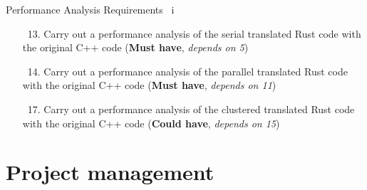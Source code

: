 \documentclass[10pt,aspectratio=169]{beamer}
\newcommand{\cmark}{\ding{51}}
\newcommand{\done}{\rlap{$\square$}{\raisebox{2pt}{\large\hspace{1pt}\textcolor{green}{\cmark}}}\hspace{-2.5pt}}
\begin{document}
\begin{frame}{Performance Analysis Requirements \ i}
    \begin{itemize}
        \item[\done\ 13.]
          Carry out a performance analysis of the serial translated Rust code with the original C++ code
          (\textbf{Must have}, \textit{depends on 5})
        \item[\done\ 14.]
          Carry out a performance analysis of the parallel translated Rust code with the original C++ code
          (\textbf{Must have}, \textit{depends on 11})
        \item[\done\ 17.]
          Carry out a performance analysis of the clustered translated Rust code with the original C++ code
          (\textbf{Could have}, \textit{depends on 15})
    \end{itemize}
\end{frame}






\section{Project management}
\end{document}
